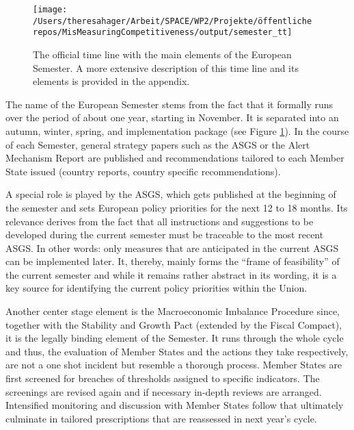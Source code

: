 \documentclass[
]{article}
\begin{document}
\begin{figure}

{\centering \texttt{[image: /Users/theresahager/Arbeit/SPACE/WP2/Projekte/öffentliche repos/MisMeasuringCompetitiveness/output/semester\_tt]} 

}

\caption{The official time line with the main elements of the European Semester. A more extensive description of this time line and its elements is provided in the appendix.}\label{fig:semtt}
\end{figure}

The name of the European Semester stems from the fact that it formally runs
over the period of about one year, starting in November.
It is separated into an autumn, winter, spring, and implementation package
(see Figure \ref{fig:semtt}).
In the course of each Semester, general strategy papers such as the ASGS or the
Alert Mechanism Report are published and recommendations tailored to each Member
State issued (country reports, country specific recommendations).

A special role is played by the ASGS, which gets published at the beginning
of the semester and sets European
policy priorities for the next 12 to 18 months.
Its relevance derives from the fact that all instructions and suggestions
to be developed during the current semester must be traceable to the
most recent ASGS.
In other words: only measures that are anticipated in the current ASGS
can be implemented later.
It, thereby, mainly forms the \enquote{frame of feasibility} of
the current semester and while it remains rather abstract in its wording,
it is a key source for identifying the current policy priorities within the
Union.

Another center stage element is the Macroeconomic Imbalance Procedure since, together
with the Stability and Growth Pact (extended by the Fiscal Compact), it is the legally binding element of the Semester.
It runs through the whole cycle and thus, the evaluation of Member States
and the actions they take respectively, are not a one shot incident but resemble a
thorough process. Member States are first screened for breaches of thresholds
assigned to specific indicators. The screenings are revised again and if necessary
in-depth reviews are arranged. Intensified monitoring and discussion with Member
States follow that ultimately culminate in tailored prescriptions that are reassessed
in next year's cycle.
\end{document}
